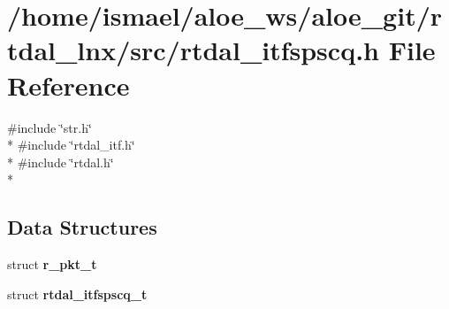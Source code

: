 \section{/home/ismael/aloe\-\_\-ws/aloe\-\_\-git/rtdal\-\_\-lnx/src/rtdal\-\_\-itfspscq.h File Reference}
\label{rtdal__itfspscq_8h}
{\ttfamily \#include \char`\"{}str.\-h\char`\"{}}\\*
{\ttfamily \#include \char`\"{}rtdal\-\_\-itf.\-h\char`\"{}}\\*
{\ttfamily \#include \char`\"{}rtdal.\-h\char`\"{}}\\*
\subsection*{Data Structures}
\begin{DoxyCompactItemize}
\item 
struct {\bf r\-\_\-pkt\-\_\-t}
\item 
struct {\bf rtdal\-\_\-itfspscq\-\_\-t}
\end{DoxyCompactItemize}

